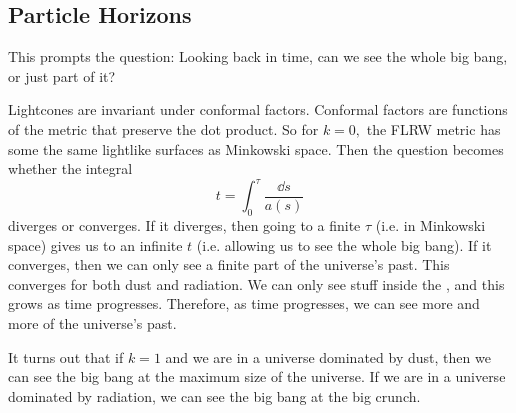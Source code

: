 \documentclass{article}
\numberwithin{equation}{section}
\begin{document}
\subsection{Particle Horizons}
This prompts the question: Looking back in time, can we see the whole big bang, or just part of it?

Lightcones are invariant under conformal factors. Conformal factors are functions of the metric that preserve the dot product. So for $k=0,$ the FLRW metric has some the same lightlike surfaces as Minkowski space. Then the question becomes whether the integral 
\begin{equation*}
    t = \int_0^{\tau} \frac{\dd{s}}{a(s)}
\end{equation*}
diverges or converges. If it diverges, then going to a finite $\tau$ (i.e. in Minkowski space) gives us to an infinite $t$ (i.e. allowing us to see the whole big bang). If it converges, then we can only see a finite part of the universe's past. This converges for both dust and radiation. We can only see stuff inside the , and this grows as time progresses. Therefore, as time progresses, we can see more and more of the universe's past.

It turns out that if $k=1$ and we are in a universe dominated by dust, then we can see the big bang at the maximum size of the universe. If we are in a universe dominated by radiation, we can see the big bang at the big crunch.
\end{document}
